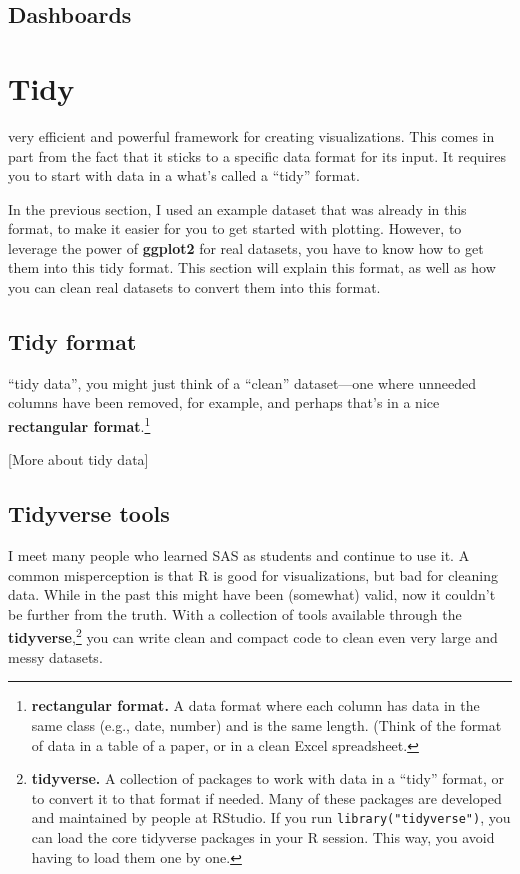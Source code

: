 \documentclass[]{tufte-book}
\begin{document}
\hypertarget{dashboards}{%
\section{Dashboards}\label{dashboards}}

\hypertarget{tidy}{%
\chapter{Tidy}\label{tidy}}

 very efficient and powerful
framework for
creating visualizations. This comes in part from the fact that it sticks
to a specific data format for its input. It requires you to start with
data in a what's called a ``tidy'' format.

In the previous section, I used an example dataset that was already in this
format, to make it easier for you to get started with plotting. However,
to leverage the power of \textbf{ggplot2} for real datasets, you have to know
how to get them into this tidy format. This section will explain this format,
as well as how you can clean real datasets to convert them into this format.

\hypertarget{tidy-format}{%
\section{Tidy format}\label{tidy-format}}

 ``tidy data'', you might just think of a ``clean''
dataset---one where unneeded columns have been removed, for example, and
perhaps that's in a nice \textbf{rectangular format}.\footnote{\textbf{rectangular format.} A data format
  where each column has data in the same class (e.g., date, number) and is the
  same length. (Think of the format of data in a table of a paper, or in a clean
  Excel spreadsheet.}

{[}More about tidy data{]}

\hypertarget{tidyverse-tools}{%
\section{Tidyverse tools}\label{tidyverse-tools}}

 I meet many people who learned SAS as students
and continue
to use it. A common misperception is that R is good for visualizations, but bad for
cleaning data. While in the past this might have been (somewhat) valid, now it couldn't
be further from the truth. With a collection of tools available through the
\textbf{tidyverse},\footnote{\textbf{tidyverse.} A collection of packages to work with data in a
  ``tidy'' format, or to convert it to that format if needed. Many of these packages
  are developed and maintained by people at RStudio. If you run \texttt{library("tidyverse")},
  you can load the core tidyverse packages in your R session. This way, you avoid
  having to load them one by one.}
you can write clean and compact code to clean even very large and
messy datasets.
\end{document}
